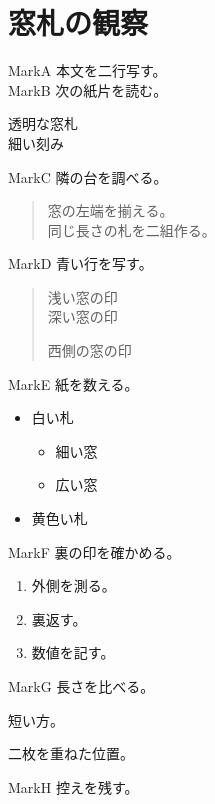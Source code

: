 \documentclass[a4paper,11pt]{ltjsarticle}
\begin{document}
\tableofcontents
\clearpage
\section{窓札の観察}
\noindent MarkA 本文を二行写す。\\
MarkB 次の紙片を読む。
\begin{center}透明な窓札\\細い刻み\end{center}
\noindent MarkC 隣の台を調べる。
\begin{quote}窓の左端を揃える。\\同じ長さの札を二組作る。\end{quote}
\noindent MarkD 青い行を写す。
\begin{verse}浅い窓の印\\深い窓の印

西側の窓の印\end{verse}
\noindent MarkE 紙を数える。
\begin{itemize}[itemsep=3pt]
\item 白い札
\begin{itemize}\item 細い窓\item 広い窓\end{itemize}
\item 黄色い札
\end{itemize}
\noindent MarkF 裏の印を確かめる。
\begin{enumerate}\item 外側を測る。\item 裏返す。\item 数値を記す。\end{enumerate}
\noindent MarkG 長さを比べる。
\begin{description}[style=nextline,leftmargin=4em,labelwidth=3em]
\item[端] 短い方。
\item[折り返した場所] 二枚を重ねた位置。
\end{description}
\noindent MarkH 控えを残す。
\clearpage
\end{document}
